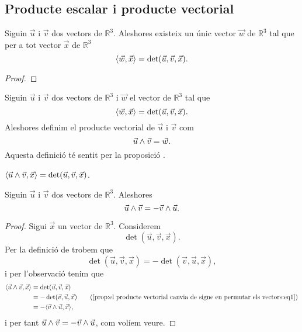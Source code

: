 \documentclass[../Apunts.tex]{subfiles}
\begin{document}
	\subsection{Producte escalar i producte vectorial} %
	\begin{proposition}
		\label{prop:unicitat del producte vectorial entre dos vectors}
		Siguin \(\vec{u}\) i \(\vec{v}\) dos vectors de \(\mathbb{R}^{3}\). Aleshores existeix un únic vector \(\vec{w}\) de \(\mathbb{R}^{3}\) tal que per a tot vector \(\vec{x}\) de \(\mathbb{R}^{3}\)
		\[\prodesc{\vec{w}}{\vec{x}}=\det(\vec{u},\vec{v},\vec{x}).\]
		\begin{proof}
		\end{proof}
	\end{proposition}
	\begin{definition}
		\label{def:producte vectorial}
		Siguin \(\vec{u}\) i \(\vec{v}\) dos vectors de \(\mathbb{R}^{3}\) i \(\vec{w}\) el vector de \(\mathbb{R}^{3}\) tal que
		\[\prodesc{\vec{w}}{\vec{x}}=\det(\vec{u},\vec{v},\vec{x}).\]
		Aleshores definim el producte vectorial de \(\vec{u}\) i \(\vec{v}\) com
		\[\vec{u}\mathbin{\wedge}\vec{v}=\vec{w}.\]
		Aquesta definició té sentit per la proposició .
	\end{definition}
	\begin{observation}
		\label{obs:fórmula del determinant segons el producte vectorial i el producte escalar}
		\(\prodesc{\vec{u}\prodvec\vec{v}}{\vec{x}}=\det(\vec{u},\vec{v},\vec{x})\).
	\end{observation}
	\begin{proposition}
	\label{prop:el producte vectorial canvia de signe en permutar els vectors}
		Siguin \(\vec{u}\) i \(\vec{v}\) dos vectors de \(\mathbb{R}^{3}\). Aleshores
		\[\vec{u}\mathbin{\wedge}\vec{v}=-\vec{v}\mathbin{\wedge}\vec{u}.\]
		\begin{proof}
			Sigui \(\vec{x}\) un vector de \(\mathbb{R}^{3}\). Considerem
			\[\det(\vec{u},\vec{v},\vec{x}).\]
			Per la definició de  trobem que %
			\begin{equation}
				\label{prop:el producte vectorial canvia de signe en permutar els vectors:eq1}
				\det(\vec{u},\vec{v},\vec{x})=-\det(\vec{v},\vec{u},\vec{x}),
			\end{equation}
			i per l'observació  tenim que
			\begin{align*}
				\prodesc{\vec{u}\prodvec\vec{v}}{\vec{x}}&=\det(\vec{u},\vec{v},\vec{x}) \\
				&=-\det(\vec{v},\vec{u},\vec{x}) \tag{\ref{prop:el producte vectorial canvia de signe en permutar els vectors:eq1}}\\
				&=-\prodesc{\vec{v}\prodvec\vec{u}}{\vec{x}},
			\end{align*}
			i per tant \(\vec{u}\mathbin{\wedge}\vec{v}=-\vec{v}\mathbin{\wedge}\vec{u}\), com volíem veure. %
		\end{proof}
	\end{proposition}
\end{document}
